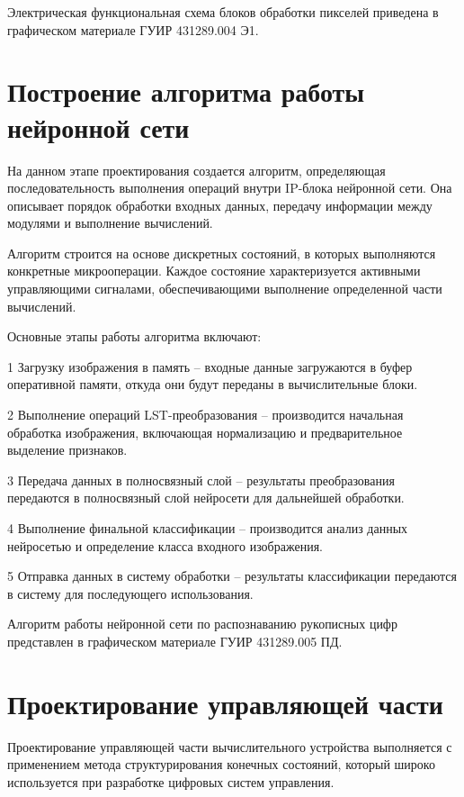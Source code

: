 Электрическая функциональная схема блоков обработки пикселей приведена в 
графическом материале ГУИР 431289.004 Э1.

\section{Построение алгоритма работы нейронной сети}
\hspace*{12.5 mm}На данном этапе проектирования создается алгоритм, 
определяющая последовательность выполнения операций внутри IP-блока нейронной 
сети. Она описывает порядок обработки входных данных, передачу информации между 
модулями и выполнение вычислений.

Алгоритм строится на основе дискретных состояний, в которых выполняются 
конкретные микрооперации. Каждое состояние характеризуется активными 
управляющими сигналами, обеспечивающими выполнение определенной части 
вычислений.

Основные этапы работы алгоритма включают:

  1 Загрузку изображения в память – входные данные загружаются в буфер 
оперативной памяти, откуда они будут переданы в вычислительные блоки.

  2 Выполнение операций LST-преобразования – производится начальная обработка 
изображения, включающая нормализацию и предварительное выделение признаков.

  3 Передача данных в полносвязный слой – результаты преобразования передаются 
в полносвязный слой нейросети для дальнейшей обработки.

  4 Выполнение финальной классификации – производится анализ данных нейросетью
и определение класса входного изображения.

  5 Отправка данных в систему обработки – результаты классификации передаются
в систему для последующего использования.

Алгоритм работы нейронной сети по распознаванию рукописных цифр представлен в 
графическом материале ГУИР 431289.005 ПД. 

\section{Проектирование управляющей части}
\hspace*{12.5 mm}Проектирование управляющей части вычислительного устройства 
выполняется с применением метода структурирования конечных состояний, который 
широко используется при разработке цифровых систем управления.


